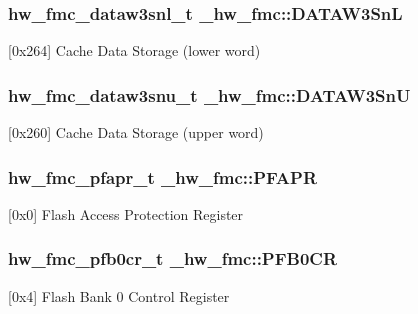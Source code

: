 \subsubsection[{\texorpdfstring{D\+A\+T\+A\+W3\+SnL}{DATAW3SnL}}]{ {\bf hw\+\_\+fmc\+\_\+dataw3snl\+\_\+t} \+\_\+hw\+\_\+fmc\+::\+D\+A\+T\+A\+W3\+SnL}\hypertarget{struct__hw__fmc_aab36f7ff94f108996bee1605190fadb3}{}\label{struct__hw__fmc_aab36f7ff94f108996bee1605190fadb3}
\mbox{[}0x264\mbox{]} Cache Data Storage (lower word) 
\subsubsection[{\texorpdfstring{D\+A\+T\+A\+W3\+SnU}{DATAW3SnU}}]{ {\bf hw\+\_\+fmc\+\_\+dataw3snu\+\_\+t} \+\_\+hw\+\_\+fmc\+::\+D\+A\+T\+A\+W3\+SnU}\hypertarget{struct__hw__fmc_ae6085d470d4279bb18ee1e4445160867}{}\label{struct__hw__fmc_ae6085d470d4279bb18ee1e4445160867}
\mbox{[}0x260\mbox{]} Cache Data Storage (upper word) 
\subsubsection[{\texorpdfstring{P\+F\+A\+PR}{PFAPR}}]{ {\bf hw\+\_\+fmc\+\_\+pfapr\+\_\+t} \+\_\+hw\+\_\+fmc\+::\+P\+F\+A\+PR}\hypertarget{struct__hw__fmc_a56e94a71c330fefdb1a95c0b5b46a1c8}{}\label{struct__hw__fmc_a56e94a71c330fefdb1a95c0b5b46a1c8}
\mbox{[}0x0\mbox{]} Flash Access Protection Register 
\subsubsection[{\texorpdfstring{P\+F\+B0\+CR}{PFB0CR}}]{ {\bf hw\+\_\+fmc\+\_\+pfb0cr\+\_\+t} \+\_\+hw\+\_\+fmc\+::\+P\+F\+B0\+CR}\hypertarget{struct__hw__fmc_a54b5771fb74053daa08f3359ea870c2f}{}\label{struct__hw__fmc_a54b5771fb74053daa08f3359ea870c2f}
\mbox{[}0x4\mbox{]} Flash Bank 0 Control Register 
